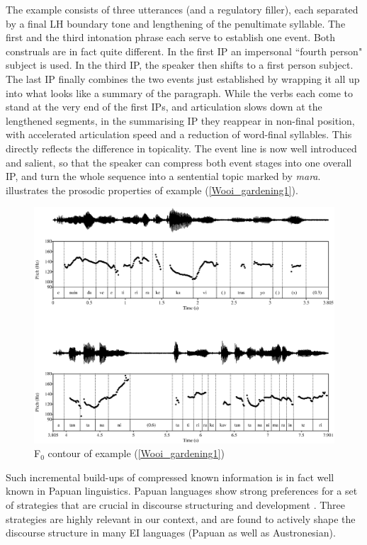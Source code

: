 The example consists of three utterances (and a regulatory filler), each separated by a final LH boundary tone and lengthening of the penultimate syllable. The first and the third intonation phrase each serve to establish one event. Both construals are in fact quite different. In the first IP an impersonal ``fourth person" subject is used. In the third IP, the speaker then shifts to a first person subject. The last IP finally combines the two events just established by wrapping it all up into what looks like a summary of the paragraph. While the verbs each come to stand at the very end of the first IPs, and articulation slows down at the lengthened segments, in the summarising IP they reappear in non-final position, with accelerated articulation speed and a reduction of word-final syllables. This directly reflects the difference in topicality. The event line is now well introduced and salient, so that the speaker can compress both event stages into one overall IP, and turn the whole sequence into a sentential topic marked by \textit{mara}.  illustrates the prosodic properties of example (\ref{Wooi_gardening1}).

\begin{figure}
\includegraphics[width=1.2\textwidth]{figures/gardening1_burnplant.eps} 
\caption{F$_0$ contour of example (\ref{Wooi_gardening1})}\label{fig:gardening_pitch}
\end{figure}

Such incremental build-ups of compressed known information is in fact well known in Papuan linguistics. Papuan languages show strong preferences for a set of strategies that are crucial in discourse structuring and development \citep{devries2005towards, devries2006areal}. Three strategies are highly relevant in our context, and are found to actively shape the discourse structure in many EI languages (Papuan as well as Austronesian). 

